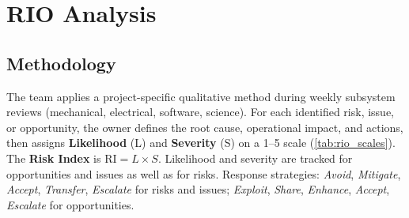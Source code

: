 %
%

\section{RIO Analysis}
\label{sec:rio}

\subsection{Methodology}
\label{subsec:rio_method}

The team applies a project-specific qualitative method during weekly subsystem
reviews (mechanical, electrical, software, science). For each identified risk,
issue, or opportunity, the owner defines the root cause, operational impact,
and actions, then assigns \textbf{Likelihood} (L) and \textbf{Severity} (S) on
a 1--5 scale (\autoref{tab:rio_scales}). The \textbf{Risk Index} is
$\mathrm{RI} = L \times S$. Likelihood and severity are tracked for
opportunities and issues as well as for risks. Response strategies:
\textit{Avoid}, \textit{Mitigate}, \textit{Accept}, \textit{Transfer},
\textit{Escalate} for risks and issues; \textit{Exploit}, \textit{Share},
\textit{Enhance}, \textit{Accept}, \textit{Escalate} for opportunities.

